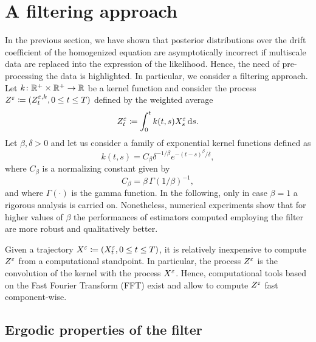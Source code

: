 \documentclass[10pt]{article}
\begin{document}
\section{A filtering approach}

In the previous section, we have shown that posterior distributions over the drift coefficient of the homogenized equation are asymptotically incorrect if multiscale data are replaced into the expression of the likelihood. Hence, the need of pre-processing the data is highlighted. In particular, we consider a filtering approach. Let $k \colon \mathbb{R}^+ \times \mathbb{R}^+ \to \mathbb{R}$ be a kernel function and consider the process $Z^\varepsilon \coloneqq (Z^{\varepsilon,k}_t, 0 \leq t \leq T)$ defined by the weighted average
\begin{equation}\label{eq:ZDef}
	Z^{\varepsilon}_t \coloneqq \int_0^t k(t, s)X^\varepsilon_s \,\mathrm{d} s.
\end{equation}
Let $\beta, \delta > 0$ and let us consider a family of exponential kernel functions defined as
\begin{equation}\label{eq:filter}
	k(t, s) = C_\beta \delta^{-1/\beta} e^{-(t-s)^\beta/\delta},
\end{equation}
where $C_{\beta}$ is a normalizing constant given by
\begin{equation}
	C_\beta = \beta \, \Gamma(1/\beta)^{-1},
\end{equation}
and where $\Gamma(\cdot)$ is the gamma function. In the following, only in case $\beta = 1$ a rigorous analysis is carried on. Nonetheless, numerical experiments show that for higher values of $\beta$ the performances of estimators computed employing the filter are more robust and qualitatively better. 

Given a trajectory $X^\varepsilon \coloneqq (X^\varepsilon_t, 0\leq t \leq T)$, it is relatively inexpensive to compute $Z^\varepsilon$ from a computational standpoint. In particular, the process $Z^\varepsilon$ is the convolution of the kernel with the process $X^\varepsilon$. Hence, computational tools based on the Fast Fourier Transform (FFT) exist and allow to compute $Z^\varepsilon$ fast component-wise.

\subsection{Ergodic properties of the filter}\label{sec:ergodic}
\end{document}
